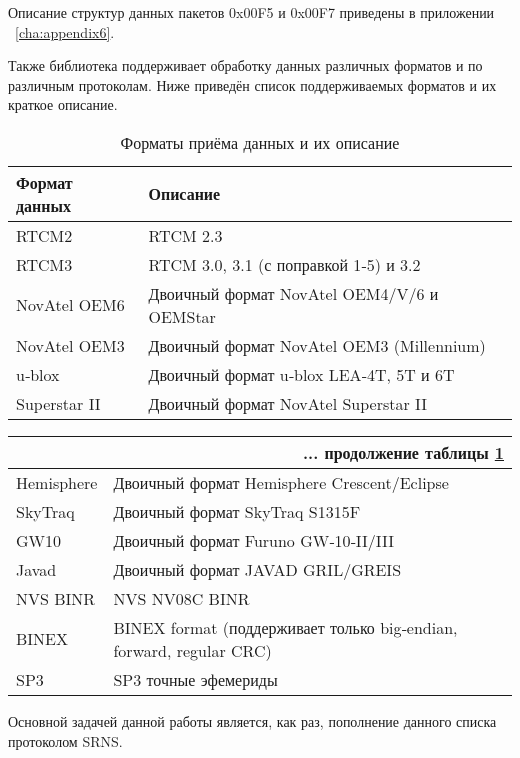 Описание структур данных пакетов 0x00F5 и 0x00F7 приведены в приложении ~\ref{cha:appendix6}.

Также библиотека поддерживает обработку данных различных форматов и по различным протоколам. Ниже приведён список поддерживаемых форматов и их краткое описание.

\begin{longtable}{|p{4cm}|p{12cm}|}
	\caption{Форматы приёма данных и их описание} \label{tab:format}\\
	\hline
	Формат данных & Описание \\
	\hline
	RTCM2 & RTCM 2.3 \\
	\hline
	RTCM3  & RTCM 3.0, 3.1 (с поправкой 1‐5) и 3.2 \\
	\hline
	NovAtel OEM6 & Двоичный формат NovAtel OEM4/V/6 и OEMStar  \\
	\hline
	NovAtel OEM3  & Двоичный формат NovAtel OEM3 (Millennium) \\
	\hline
	u‐blox  & Двоичный формат u‐blox LEA‐4T, 5T и 6T  \\
	\hline
	Superstar II  & Двоичный формат NovAtel Superstar II  \\
	\hline
	\end{longtable}
	\newpage
	\begin{longtable}{|p{4cm}|p{12cm}|}
	\multicolumn{2}{r}{... продолжение таблицы \ref{tab:format}}\\ [1em] 
	\hline
	Hemisphere & Двоичный формат Hemisphere Crescent/Eclipse  \\
	\hline
	SkyTraq  & Двоичный формат SkyTraq S1315F  \\
	\hline
	GW10 &  Двоичный формат Furuno GW‐10‐II/III  \\
	\hline
	Javad  & Двоичный формат JAVAD GRIL/GREIS  \\
	\hline
	NVS BINR & NVS NV08C BINR \\
	\hline
	BINEX  & BINEX format (поддерживает только big‐endian, forward, regular CRC) \\
	\hline
	SP3  & SP3 точные эфемериды \\
	\hline
\end{longtable}

Основной задачей данной работы является, как раз, пополнение данного списка протоколом SRNS.

